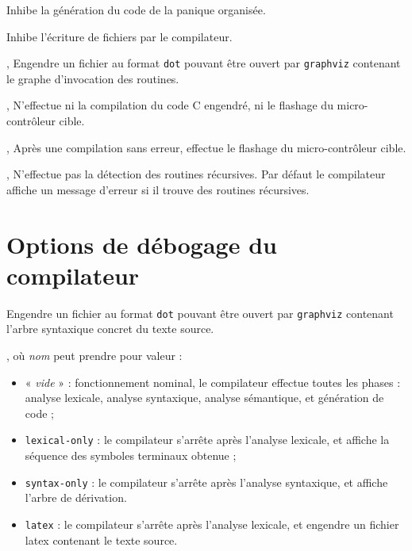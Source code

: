 
 Inhibe la génération du code de la panique organisée.



 Inhibe l'écriture de fichiers par le compilateur.


,  Engendre un fichier au format \texttt{dot} pouvant être ouvert par \texttt{graphviz} contenant le graphe d'invocation des routines.

,  N'effectue ni la compilation du code C engendré, ni le flashage du micro-contrôleur cible.


,  Après une compilation sans erreur, effectue le flashage du micro-contrôleur cible.


,  N'effectue pas la détection des routines récursives. Par défaut le compilateur affiche un message d'erreur si il trouve des routines récursives.






\section{Options de débogage du compilateur}


 Engendre un fichier au format \texttt{dot} pouvant être ouvert par \texttt{graphviz} contenant l'arbre syntaxique concret du texte source.


, où \emph{nom} peut prendre pour valeur :
\begin{itemize}
  \item « \emph{vide} » : fonctionnement nominal, le compilateur effectue toutes les phases : analyse lexicale, analyse syntaxique, analyse sémantique, et génération de code ;
  \item \texttt{lexical-only} : le compilateur s'arrête après l'analyse lexicale, et affiche la séquence des symboles terminaux obtenue ;
  \item \texttt{syntax-only} : le compilateur s'arrête après l'analyse syntaxique, et affiche l'arbre de dérivation.
  \item \texttt{latex} : le compilateur s'arrête après l'analyse lexicale, et engendre un fichier latex contenant le texte source.
\end{itemize}


